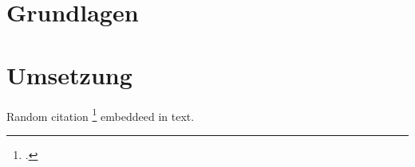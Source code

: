 \documentclass[
	12pt, %
	DIV12,
	ngerman, %
	a4paper, %
	oneside, %
	titlepage, %
	parskip=half, %
	headings=normal, %
	listof=totoc, %
	bibliography=totoc, %
	index=totoc, %
	captions=tableheading, %
	]{scrreprt}
\begin{document}
	
	
	
	
		
	
		
	
	\tableofcontents

	
	
	
	
	
	\part{Grundlagen}	
	

		
	\part{Umsetzung}
	
	
	
	
	
	
		

		
						
	
	
	
	Random citation 
	\footcite[S. 111]{messaging} embeddeed in text.
	

	
	
	
	
	\nocite{*}
	 
	
	
	\renewcommand{\lstlistlistingname}{Verzeichnis der Listings}
	\lstlistoflistings %

	\listoffigures 
	
\end{document}

